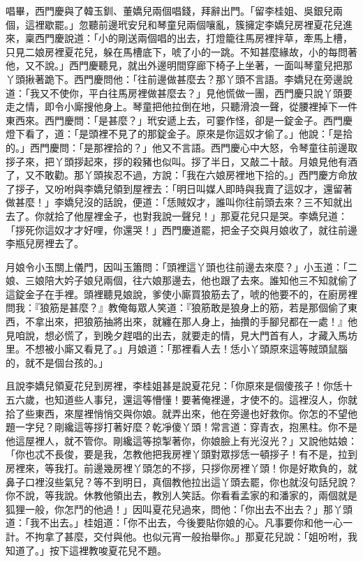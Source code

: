 唱畢，西門慶與了韓玉釧、董嬌兒兩個唱錢，拜辭出門。「留李桂姐、吳銀兒兩個，這裡歇罷。」忽聽前邊玳安兒和琴童兒兩個嚷亂，簇擁定李嬌兒房裡夏花兒進來，稟西門慶說道：「小的剛送兩個唱的出去，打燈籠往馬房裡拌草，牽馬上槽，只見二娘房裡夏花兒，躲在馬槽底下，唬了小的一跳。不知甚麼緣故，小的每問著他，又不說。」西門慶聽見，就出外邊明間穿廊下椅子上坐著，一面叫琴童兒把那丫頭揪著跪下。西門慶問他：「往前邊做甚麼去？那丫頭不言語。李嬌兒在旁邊說道：「我又不使你，平白往馬房裡做甚麼去？」見他慌做一團，西門慶只說丫頭要走之情，即令小廝搜他身上。琴童把他拉倒在地，只聽滑浪一聲，從腰裡掉下一件東西來。西門慶問：「是甚麼？」玳安遞上去，可霎作怪，卻是一錠金子。西門慶燈下看了，道：「是頭裡不見了的那錠金子。原來是你這奴才偷了。」他說：「是拾的。」西門慶問：「是那裡拾的？」他又不言語。西門慶心中大怒，令琴童往前邊取拶子來，把丫頭拶起來，拶的殺豬也似叫。拶了半日，又敲二十敲。月娘見他有酒了，又不敢勸。那丫頭挨忍不過，方說：「我在六娘房裡地下拾的。」西門慶方命放了拶子，又吩咐與李嬌兒領到屋裡去：「明日叫媒人即時與我賣了這奴才，還留著做甚麼！」李嬌兒沒的話說，便道：「恁賊奴才，誰叫你往前頭去來？三不知就出去了。你就拾了他屋裡金子，也對我說一聲兒！」那夏花兒只是哭。李嬌兒道：「拶死你這奴才才好哩，你還哭！」西門慶道罷，把金子交與月娘收了，就往前邊李瓶兒房裡去了。

月娘令小玉關上儀門，因叫玉簫問：「頭裡這丫頭也往前邊去來麼？」小玉道：「二娘、三娘陪大妗子娘兒兩個，往六娘那邊去，他也跟了去來。誰知他三不知就偷了這錠金子在手裡。頭裡聽見娘說，爹使小廝買狼筋去了，唬的他要不的，在廚房裡問我：『狼筋是甚麼？』教俺每眾人笑道：『狼筋敢是狼身上的筋，若是那個偷了東西，不拿出來，把狼筋抽將出來，就纏在那人身上，抽攢的手腳兒都在一處！』他見咱說，想必慌了，到晚夕趕唱的出去，就要走的情，見大門首有人，才藏入馬坊里。不想被小廝又看見了。」月娘道：「那裡看人去！恁小丫頭原來這等賊頭鼠腦的，就不是個台孩的。」

且說李嬌兒領夏花兒到房裡，李桂姐甚是說夏花兒：「你原來是個傻孩子！你恁十五六歲，也知道些人事兒，還這等懵懂！要著俺裡邊，才使不的。這裡沒人，你就拾了些東西，來屋裡悄悄交與你娘。就弄出來，他在旁邊也好救你。你怎的不望他題一字兒？剛纔這等拶打著好麼？乾凈傻丫頭！常言道：穿青衣，抱黑柱。你不是他這屋裡人，就不管你。剛纔這等掠掣著你，你娘臉上有光沒光？」又說他姑娘：「你也忒不長俊，要是我，怎教他把我房裡丫頭對眾拶恁一頓拶子！有不是，拉到房裡來，等我打。前邊幾房裡丫頭怎的不拶，只拶你房裡丫頭！你是好欺負的，就鼻子口裡沒些氣兒？等不到明日，真個教他拉出這丫頭去罷，你也就沒句話兒說？你不說，等我說。休教他領出去，教別人笑話。你看看孟家的和潘家的，兩個就是狐狸一般，你怎鬥的他過！」因叫夏花兒過來，問他：「你出去不出去？」那丫頭道：「我不出去。」桂姐道：「你不出去，今後要貼你娘的心。凡事要你和他一心一計。不拘拿了甚麼，交付與他。也似元宵一般抬舉你。」那夏花兒說：「姐吩咐，我知道了。」按下這裡教唆夏花兒不題。

